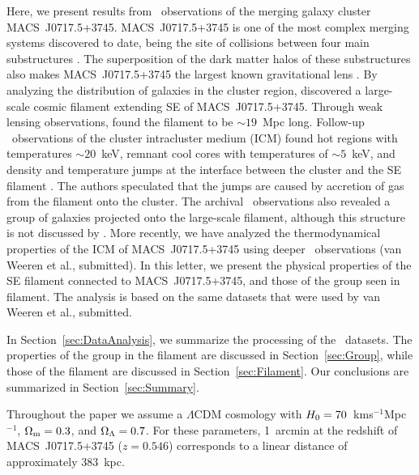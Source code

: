 Here, we present results from \chandra\ observations of the merging galaxy cluster MACS~J0717.5+3745. MACS~J0717.5+3745 \citep[$z=0.546$;][]{Ebeling2001, Ebeling2007} is one of the most complex merging systems discovered to date, being the site of collisions between four main substructures \citep{Ma2009, Medezinski2013}. The superposition of the dark matter halos of these substructures also makes MACS~J0717.5+3745 the largest known gravitational lens \citep{Zitrin2009, Medezinski2013}. By analyzing the distribution of galaxies in the cluster region, \citet{Ebeling2004} discovered a large-scale cosmic filament extending SE of MACS~J0717.5+3745. Through weak lensing observations, \citet{Jauzac2012} found the filament to be $\sim 19$~Mpc long. Follow-up \chandra\ observations of the cluster intracluster medium (ICM) found hot regions with temperatures $\sim 20$~keV, remnant cool cores with temperatures of $\sim 5$~keV, and density and temperature jumps at the interface between the cluster and the SE filament \citep{Ma2009}. The authors speculated that the jumps are caused by accretion of gas from the filament onto the cluster. The archival \chandra\ observations also revealed a group of galaxies projected onto the large-scale filament, although this structure is not discussed by \citet{Ma2009}. More recently, we have analyzed the thermodynamical properties of the ICM of MACS~J0717.5+3745 using deeper \chandra\ observations (van Weeren et al., submitted). In this letter, we present the physical properties of the SE filament connected to MACS~J0717.5+3745, and those of the group seen in filament. The analysis is based on the same datasets that were used by van Weeren et al., submitted.

In Section~\ref{sec:DataAnalysis}, we summarize the processing of the \chandra\ datasets. The properties of the group in the filament are discussed in Section~\ref{sec:Group}, while those of the filament are discussed in Section~\ref{sec:Filament}. Our conclusions are summarized in Section~\ref{sec:Summary}.

Throughout the paper we assume a $\Lambda$CDM cosmology with $H_{\rm 0} = 70$~km\;s$^{-1}$\;Mpc$^{-1}$, $\Omega_{\rm m} = 0.3$, and $\Omega_{\rm \Lambda} = 0.7$. For these parameters, 1~arcmin at the redshift of MACS~J0717.5+3745 ($z=0.546$) corresponds to a linear distance of approximately 383~kpc. 

